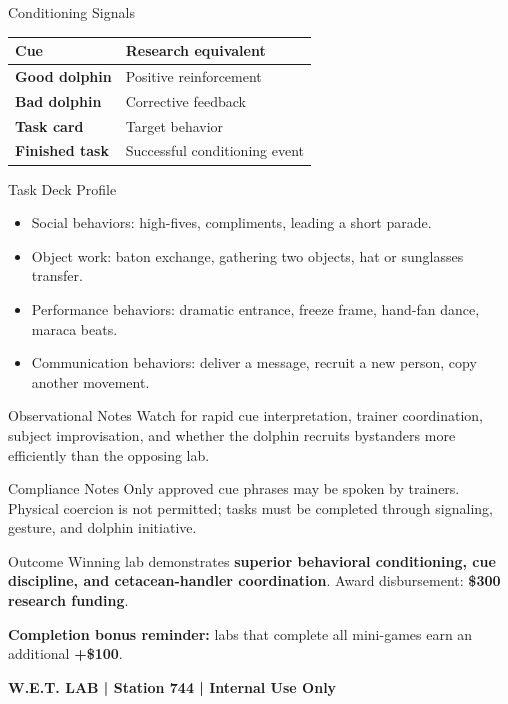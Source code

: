 \documentclass[10pt]{article}
\begin{document}
\begin{minipage}[t]{0.485\textwidth}
\vspace{0pt}
\begin{labbox}{Conditioning Signals}
\begin{tabularx}{\linewidth}{@{}>{\bfseries}l Y@{}}
\toprule
Cue & Research equivalent \\
\midrule
Good dolphin & Positive reinforcement \\
Bad dolphin & Corrective feedback \\
Task card & Target behavior \\
Finished task & Successful conditioning event \\
\bottomrule
\end{tabularx}
\end{labbox}

\begin{labbox}{Task Deck Profile}
\begin{itemize}
\item Social behaviors: high-fives, compliments, leading a short parade.
\item Object work: baton exchange, gathering two objects, hat or sunglasses transfer.
\item Performance behaviors: dramatic entrance, freeze frame, hand-fan dance, maraca beats.
\item Communication behaviors: deliver a message, recruit a new person, copy another movement.
\end{itemize}
\end{labbox}

\begin{labbox}{Observational Notes}
Watch for rapid cue interpretation, trainer coordination, subject improvisation, and whether the dolphin recruits bystanders more efficiently than the opposing lab.
\end{labbox}

\begin{labbox}{Compliance Notes}
Only approved cue phrases may be spoken by trainers. Physical coercion is not permitted; tasks must be completed through signaling, gesture, and dolphin initiative.
\end{labbox}
\end{minipage}

\vspace{6pt}

\begin{labbox}{Outcome}
Winning lab demonstrates \textbf{superior behavioral conditioning, cue discipline, and cetacean-handler coordination}. Award disbursement: \textbf{\$300 research funding}.

\vspace{3pt}
\textbf{Completion bonus reminder:} labs that complete all mini-games earn an additional \textbf{+\$100}.
\end{labbox}

\vfill
\begin{center}
\footnotesize\color{agencyblue}\textbf{W.E.T. LAB | Station 744 | Internal Use Only}
\end{center}
\end{document}
